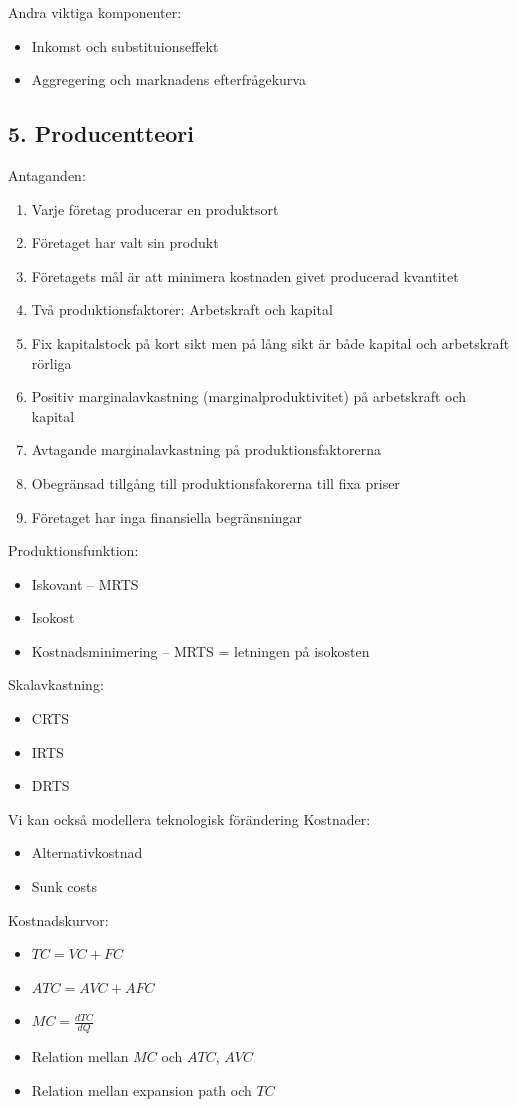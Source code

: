\documentclass[12pt,a4paper]{article}
\begin{document}
{Andra viktiga komponenter:
\begin{itemize}
    \item Inkomst och substituionseffekt
    \item Aggregering och marknadens efterfrågekurva
\end{itemize}

\subsection*{5. Producentteori}
Antaganden:
\begin{enumerate}
    \item Varje företag producerar en produktsort
    \item Företaget har valt sin produkt
    \item Företagets mål är att minimera kostnaden givet producerad kvantitet
    \item Två produktionsfaktorer: Arbetskraft och kapital  
    \item Fix kapitalstock på kort sikt men på lång sikt är både kapital och arbetskraft rörliga
    \item Positiv marginalavkastning (marginalproduktivitet) på arbetskraft och kapital
    \item Avtagande marginalavkastning på produktionsfaktorerna
    \item Obegränsad tillgång till produktionsfakorerna till fixa priser
    \item Företaget har inga finansiella begränsningar
\end{enumerate}

\noindent Produktionsfunktion:
\begin{itemize}
    \item Iskovant -- MRTS
    \item Isokost
    \item Kostnadsminimering -- MRTS = letningen på isokosten
\end{itemize}

\noindent Skalavkastning:
\begin{itemize}
    \item CRTS
    \item IRTS
    \item DRTS
\end{itemize}

\noindent Vi kan också modellera teknologisk förändering
\vspace{10pt}
\noindent Kostnader:
\begin{itemize}
    \item Alternativkostnad
    \item Sunk costs
\end{itemize}
\noindent Kostnadskurvor:
\begin{itemize}
    \item $TC = VC + FC$
    \item $ATC = AVC + AFC$
    \item $MC = \frac{dTC}{dQ}$
    \item Relation mellan $MC$ och $ATC$, $AVC$
    \item Relation mellan expansion path och $TC$
\end{itemize}

}
\end{document}
